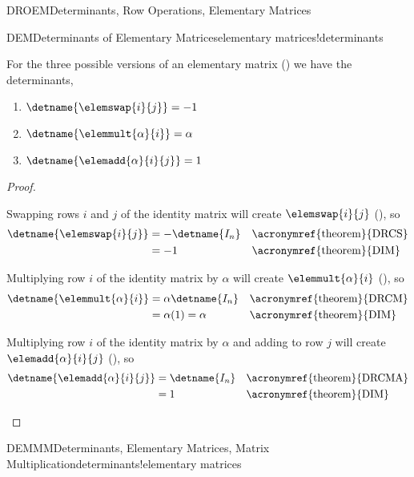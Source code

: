 \begin{subsect}{DROEM}{Determinants, Row Operations, Elementary Matrices}
%
%
\begin{theorem}{DEM}{Determinants of Elementary Matrices}{elementary matrices!determinants}
\begin{para}For the three possible versions of an elementary matrix () we have the determinants,
\begin{enumerate}
\item $\detname{\elemswap{i}{j}}=-1$
\item $\detname{\elemmult{\alpha}{i}}=\alpha$
\item $\detname{\elemadd{\alpha}{i}{j}}=1$
\end{enumerate}
\end{para}
\end{theorem}
%
\begin{proof}
\begin{para}Swapping rows $i$ and $j$ of the identity matrix will create $\elemswap{i}{j}$  (), so
%
\begin{align*}
\detname{\elemswap{i}{j}}
&=-\detname{I_n}&&\text{\acronymref{theorem}{DRCS}}\\
%
&=-1&&\text{\acronymref{theorem}{DIM}}\\
%
\end{align*}
\end{para}
\begin{para}Multiplying row $i$ of the identity matrix by $\alpha$ will create $\elemmult{\alpha}{i}$ (), so
%
\begin{align*}
\detname{\elemmult{\alpha}{i}}
&=\alpha\detname{I_n}&&\text{\acronymref{theorem}{DRCM}}\\
%
&=\alpha(1)=\alpha&&\text{\acronymref{theorem}{DIM}}\\
%
\end{align*}
\end{para}
\begin{para}Multiplying row $i$ of the identity matrix by $\alpha$ and adding to row $j$ will create $\elemadd{\alpha}{i}{j}$ (), so
%
\begin{align*}
\detname{\elemadd{\alpha}{i}{j}}
&=\detname{I_n}&&\text{\acronymref{theorem}{DRCMA}}\\
%
&=1&&\text{\acronymref{theorem}{DIM}}\\
%
\end{align*}
\end{para}
\end{proof}
%
%
\begin{theorem}{DEMMM}{Determinants, Elementary Matrices, Matrix Multiplication}{determinants!elementary matrices}

\end{theorem}
\end{subsect}
